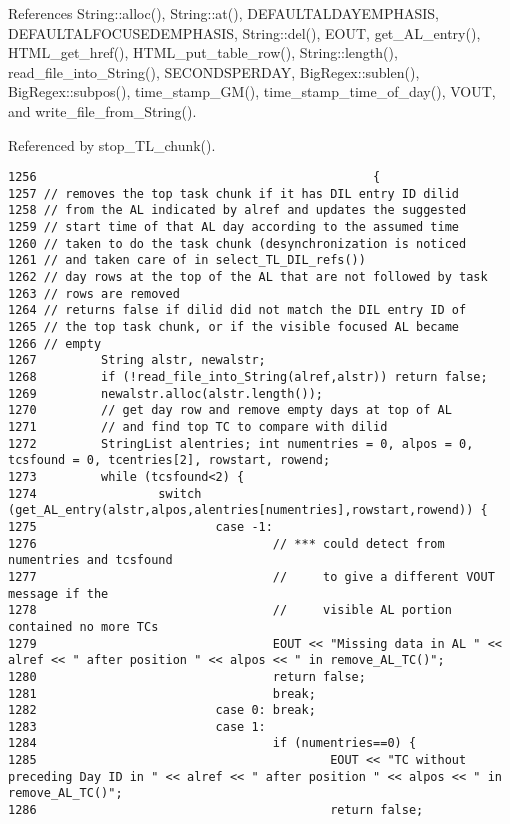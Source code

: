 References String::alloc(), String::at(), DEFAULTALDAYEMPHASIS, DEFAULTALFOCUSEDEMPHASIS, String::del(), EOUT, get\_\-AL\_\-entry(), HTML\_\-get\_\-href(), HTML\_\-put\_\-table\_\-row(), String::length(), read\_\-file\_\-into\_\-String(), SECONDSPERDAY, Big\-Regex::sublen(), Big\-Regex::subpos(), time\_\-stamp\_\-GM(), time\_\-stamp\_\-time\_\-of\_\-day(), VOUT, and write\_\-file\_\-from\_\-String().

Referenced by stop\_\-TL\_\-chunk().



\footnotesize\begin{verbatim}1256                                               {
1257 // removes the top task chunk if it has DIL entry ID dilid
1258 // from the AL indicated by alref and updates the suggested
1259 // start time of that AL day according to the assumed time
1260 // taken to do the task chunk (desynchronization is noticed
1261 // and taken care of in select_TL_DIL_refs())
1262 // day rows at the top of the AL that are not followed by task
1263 // rows are removed
1264 // returns false if dilid did not match the DIL entry ID of
1265 // the top task chunk, or if the visible focused AL became
1266 // empty
1267         String alstr, newalstr;
1268         if (!read_file_into_String(alref,alstr)) return false;
1269         newalstr.alloc(alstr.length());
1270         // get day row and remove empty days at top of AL
1271         // and find top TC to compare with dilid
1272         StringList alentries; int numentries = 0, alpos = 0, tcsfound = 0, tcentries[2], rowstart, rowend;
1273         while (tcsfound<2) {
1274                 switch (get_AL_entry(alstr,alpos,alentries[numentries],rowstart,rowend)) {
1275                         case -1:
1276                                 // *** could detect from numentries and tcsfound
1277                                 //     to give a different VOUT message if the
1278                                 //     visible AL portion contained no more TCs
1279                                 EOUT << "Missing data in AL " << alref << " after position " << alpos << " in remove_AL_TC()";
1280                                 return false;
1281                                 break;
1282                         case 0: break;
1283                         case 1:
1284                                 if (numentries==0) {
1285                                         EOUT << "TC without preceding Day ID in " << alref << " after position " << alpos << " in remove_AL_TC()";
1286                                         return false;

\end{verbatim}
